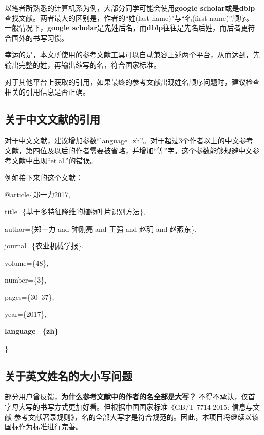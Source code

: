 以笔者所熟悉的计算机系为例，大部分同学可能会使用\textbf{google scholar}或是\textbf{dblp}查找文献。两者最大的区别是，作者的``姓(last name)''与``名(first name)''顺序。一般情况下，\textbf{google scholar}是先姓后名，而\textbf{dblp}往往是先名后姓，而后者更符合国外的书写习惯。

幸运的是，本文所使用的参考文献工具可以自动兼容上述两个平台，从而达到，先输出完整的姓，再输出缩写的名，符合国家标准。

对于其他平台上获取的引用，如果最终的参考文献出现姓名顺序问题时，建议检查相关的引用信息是否正确。

\subsection{关于中文文献的引用}

对于中文文献，建议增加参数“language={zh}”。对于超过3个作者以上的中文参考文献，第四位及以后的作者需要被省略，并增加“等”字。这个参数能够规避中文参考文献中出现“et al.”的错误。

例如接下来的这个文献：

@article\{郑一力2017,

  \hspace{2em} title=\{基于多特征降维的植物叶片识别方法\},
  
  \hspace{2em} author=\{郑一力 and 钟刚亮 and 王强 and 赵玥 and 赵燕东\},
  
  \hspace{2em} journal=\{农业机械学报\},
  
  \hspace{2em} volume=\{48\},
  
  \hspace{2em} number=\{3\},
  
  \hspace{2em} pages=\{30--37\},
  
  \hspace{2em} year=\{2017\},
  
  \hspace{2em} \textbf{language=\{zh\}}
  
\}

\subsection{关于英文姓名的大小写问题}

部分用户曾反馈，\textbf{为什么参考文献中的作者的名全部是大写？}
不得不承认，仅首字母大写的书写方式更加好看。但根据中国国家标准《GB/T 7714-2015: 信息与文献 参考文献著录规则》，名的全部大写才是符合规范的。因此，本项目将继续以该国标作为标准进行完善。

